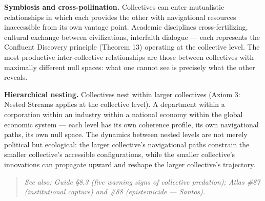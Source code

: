 \textbf{Symbiosis and cross-pollination.} Collectives can enter mutualistic relationships in which each provides the other with navigational resources inaccessible from its own vantage point. Academic disciplines cross-fertilizing, cultural exchange between civilizations, interfaith dialogue — each represents the Confluent Discovery principle (Theorem 13) operating at the collective level. The most productive inter-collective relationships are those between collectives with maximally different null spaces: what one cannot see is precisely what the other reveals.


\textbf{Hierarchical nesting.} Collectives nest within larger collectives (Axiom 3: Nested Streams applies at the collective level). A department within a corporation within an industry within a national economy within the global economic system — each level has its own coherence profile, its own navigational paths, its own null space. The dynamics between nested levels are not merely political but ecological: the larger collective's navigational paths constrain the smaller collective's accessible configurations, while the smaller collective's innovations can propagate upward and reshape the larger collective's trajectory.


\begin{quote}
\itshape
\textit{See also: Guide §8.3 (five warning signs of collective predation); Atlas \#87 (institutional capture) and \#88 (epistemicide — Santos).}
\end{quote}


\bigskip\noindent\makebox[\textwidth]{\color{rulegray}\rule{5cm}{0.3pt}}\bigskip
